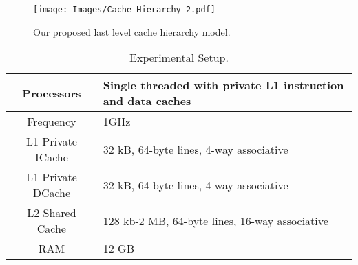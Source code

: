 \begin{figure}[!tb]
\centering
\texttt{[image: Images/Cache\_Hierarchy\_2.pdf]}
\caption{Our proposed last level cache hierarchy model.}\label{Fig:cache_hierarchy}
\end{figure}
\begin{table}[!tb] 
\centering
\caption{Experimental Setup.}
\label{Table:Experimental_Set_Up}
\begin{tabular}{|c||p{1.5in}|} 
\hline Processors & Single threaded with private L1 instruction and data caches \\
\hline Frequency & 1GHz \\
\hline L1 Private ICache & 32 kB, 64-byte lines, 4-way associative\\
\hline L1 Private DCache & 32 kB, 64-byte lines, 4-way associative \\
\hline L2 Shared Cache & 128 kb-2 MB, 64-byte lines, 16-way associative \\
\hline RAM & 12 GB \\

\hline
\end{tabular}
\end{table}
